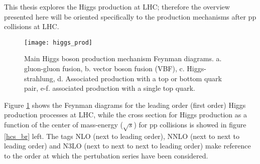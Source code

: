 \noindent This thesis explores the Higgs production at LHC; therefore the overview presented here will be oriented specifically to the production mechanisms after pp collisions at LHC.

\begin{figure}[!h]
\centering
\texttt{[image: higgs\_prod]}
\caption[Higgs boson production mechanism Feynman diagrams]{Main Higgs boson production mechanism Feynman diagrams. a. gluon-gluon fusion, b. vector boson fusion (VBF), c. Higgs-strahlung, d. Associated production with a top or bottom quark pair, e-f. associated production with a single top quark.}
\label{higgs_prod}
\end{figure}

\noindent Figure \ref{higgs_prod} shows the Feynman diagrams for the leading order (first order) Higgs production processes at LHC, while the cross section for Higgs production as a function of the center of mass-energy ($\sqrt{s}$) for pp collisions is showed in figure \ref{hcs_br} left. The tags NLO (next to leading order), NNLO (next to next to leading order) and N3LO (next to next to next to leading order) make reference to the order at which the pertubation series have been considered.

